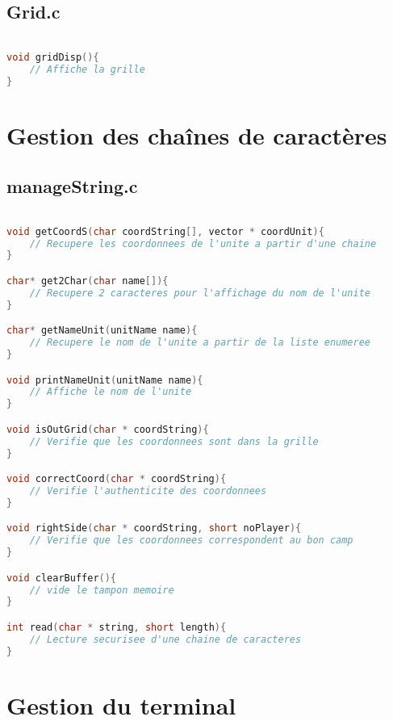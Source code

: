 \documentclass[a4paper,10pt]{extreport}
\begin{document}
\chapter{Grid.c}
\vspace{-1cm}

\begin{lstlisting}[language=c]

void gridDisp(){
	// Affiche la grille
}

\end{lstlisting}

\part{Gestion des chaînes de caractères}

\chapter{manageString.c}
\vspace{-1cm}

\begin{lstlisting}[language=c]

void getCoordS(char coordString[], vector * coordUnit){
	// Recupere les coordonnees de l'unite a partir d'une chaine
}

char* get2Char(char name[]){
	// Recupere 2 caracteres pour l'affichage du nom de l'unite
}

char* getNameUnit(unitName name){
	// Recupere le nom de l'unite a partir de la liste enumeree
}

void printNameUnit(unitName name){
	// Affiche le nom de l'unite 
}

void isOutGrid(char * coordString){
	// Verifie que les coordonnees sont dans la grille
}

void correctCoord(char * coordString){
	// Verifie l'authenticite des coordonnees
}

void rightSide(char * coordString, short noPlayer){
	// Verifie que les coordonnees correspondent au bon camp
}

void clearBuffer(){
	// vide le tampon memoire
}

int read(char * string, short length){
	// Lecture securisee d'une chaine de caracteres
}

\end{lstlisting}

\part{Gestion du terminal}
\end{document}
